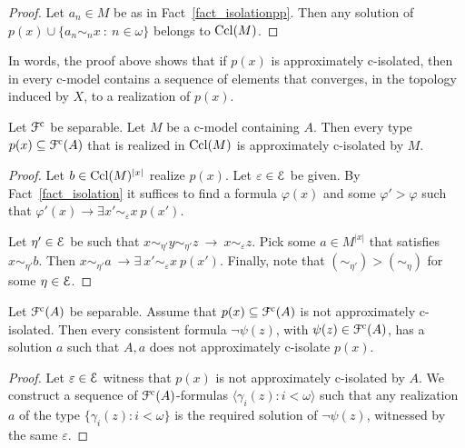 \documentclass{amsproc}
\begin{document}
{\begin{proof}
  Let $a_n\in M$ be as in Fact~\ref{fact_isolationpp}.
  Then any solution of $p(x)\cup\big\{a_n\sim_nx\ :\ n\in\omega\big\}$ belongs to ${\rm Ccl}(M)$.
\end{proof}

In words, the proof above shows that if $p(x)$ is approximately c-isolated, then in every c-model contains a sequence of elements that converges, in the topology induced by $X$, to a realization of $p(x)$.

\begin{fact}\label{fact_wcisolatio_realization}
  Let ${\EuScript F}^{\rm c}$ be separable.
  Let $M$ be a c-model containing $A$.
  Then every type $p(x)\subseteq{\EuScript F}^{\rm c}(A)$ that is realized in ${\rm Ccl}(M)$ is approximately c-isolated by $M$.
\end{fact}

\begin{proof}
  Let $b\in{\rm Ccl}(M)^{|x|}$ realize $p(x)$.
  Let $\varepsilon\in{\EuScript E}$ be given.
  By Fact~\ref{fact_isolation} it suffices to find a formula $\varphi(x)$ and some $\varphi'>\varphi$ such that $\varphi'(x)\rightarrow\exists x'\sim_\varepsilon x\ p(x')$.

  Let $\eta'\in{\EuScript E}$ be such that $x\sim_{\eta'} y\sim_{\eta'} z\ \rightarrow\ x\sim_\varepsilon z$.
  Pick some $a\in M^{|x|}$ that satisfies $x\sim_{\eta'} b$.
  Then $x\sim_{\eta'}a\ \rightarrow\exists\ x'\sim_\varepsilon x\ p(x')$.
  Finally, note that $(\sim_{\eta'})>(\sim_\eta)$ for some $\eta\in{\EuScript E}$.
\end{proof}

\begin{lemma}\label{lem_kuratowskiUlam_cont}
  Let ${\EuScript F}^{\rm c}(A)$ be separable.
  Assume that $p(x)\subseteq{\EuScript F}^{\rm c}(A)$ is not approximately c-isolated.
  Then every consistent formula $\neg\psi(z)$, with $\psi(z)\in{\EuScript F}^{\rm c}(A)$, has a solution $a$ such that $A,a$ does not approximately c-isolate $p(x)$.
\end{lemma}

\begin{proof}
  Let $\varepsilon\in{\EuScript E}$ witness that $p(x)$ is not approximately c-isolated by $A$. 
  We construct a sequence of ${\EuScript F}^{\rm c}(A)$-formulas $\langle\gamma_i(z):i<\omega\rangle$ such that any realization $a$ of the type $\big\{\gamma_i(z):i<\omega\big\}$ is the required solution of $\neg\psi(z)$, witnessed by the same $\varepsilon$.
  

\end{proof}}
\end{document}
